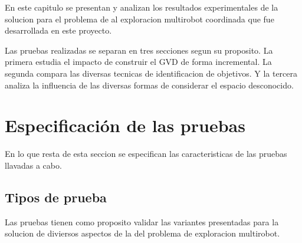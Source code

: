 En este capitulo se presentan y analizan los resultados experimentales de la
solucion para el problema de al exploracion multirobot coordinada que fue
desarrollada en este proyecto.


Las pruebas realizadas se separan en tres secciones segun su proposito. La
primera estudia el impacto de construir el GVD de forma incremental. La segunda
compara las diversas tecnicas de identificacion de objetivos. Y la tercera
analiza la influencia de las diversas formas de considerar el espacio
desconocido. 




\section{Especificación de las pruebas}


En lo que resta de esta seccion se especifican las caracteristicas de las
pruebas llavadas a cabo. 



\subsection{Tipos de prueba}

Las pruebas tienen como proposito validar las variantes presentadas para la
solucion de diviersos aspectos de la del problema de exploracion multirobot.
 
